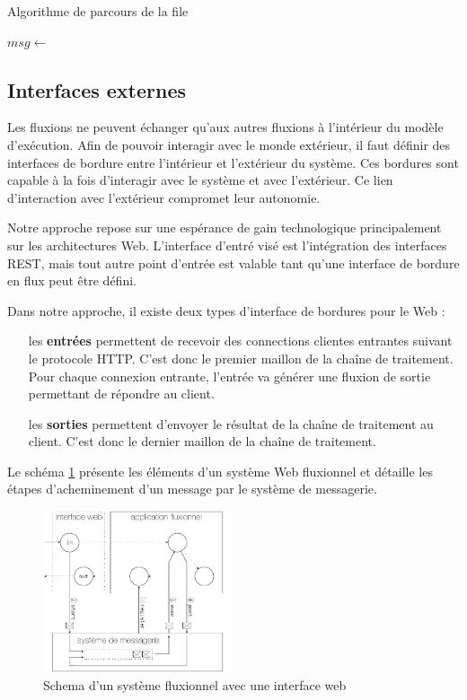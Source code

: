\begin{algorithm}
\caption{Algorithme de parcours de la file}
\label{alg:parcours}
\begin{algorithmic}
\State $msg \gets$ 
\State {}
\EndWhile
\EndWhile
\end{algorithmic}
\end{algorithm}

\subsection{Interfaces externes}

Les fluxions ne peuvent échanger qu'aux autres fluxions à l'intérieur du modèle d'exécution.
Afin de pouvoir interagir avec le monde extérieur, il faut définir des interfaces de bordure entre l'intérieur et l'extérieur du système. Ces bordures sont capable à la fois d'interagir avec le système et avec l'extérieur.
Ce lien d'interaction avec l'extérieur compromet leur autonomie.


Notre approche repose sur une espérance de gain technologique principalement sur les architectures Web.
L'interface d'entré visé est l'intégration des interfaces REST, mais tout autre point d'entrée est valable tant qu'une interface de bordure en flux peut être défini.

Dans notre approche, il existe deux types d'interface de bordures pour le Web :

\begin{itemize}
	\item[les \textbf{entrées}]
    permettent de recevoir des connections clientes entrantes suivant le protocole HTTP.
    C'est donc le premier maillon de la chaîne de traitement.
    Pour chaque connexion entrante, l'entrée va générer une fluxion de sortie permettant de répondre au client.
	\item[les \textbf{sorties}]
    permettent d'envoyer le résultat de la chaîne de traitement au client.
    C'est donc le dernier maillon de la chaîne de traitement.
\end{itemize}


Le schéma \ref{fig:schemaweb} présente les éléments d'un système Web fluxionnel et détaille les étapes d'acheminement d'un message par le système de messagerie.

\begin{figure}[h!]
	\includegraphics[width=0.5\textwidth]{schema-web.pdf}
	\caption{Schema d'un système fluxionnel avec une interface web}
	\label{fig:schemaweb}
\end{figure}

